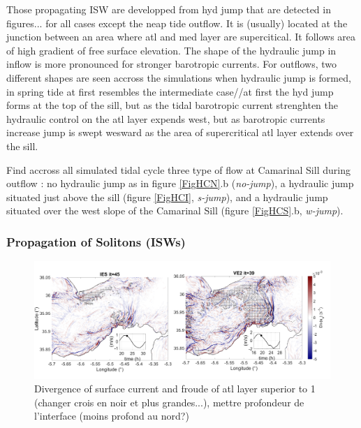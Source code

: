 Those propagating ISW are developped from hyd jump that are detected in figures... for all cases except the neap tide outflow. It is (usually) located at the junction between an area where atl and med layer are supercitical. It follows area of high gradient of free surface elevation. The shape of the hydraulic jump in inflow is more pronounced for stronger barotropic currents. For outflows, two different shapes are seen accross the simulations when hydraulic jump is formed, in spring tide at first resembles the intermediate case//at first the hyd jump forms at the top of the sill, but as the tidal barotropic current strenghten the hydraulic control on the atl layer expends west, but as barotropic currents increase jump is swept wesward as the area of supercritical atl layer extends over the sill.

Find accross all simulated tidal cycle three type of flow at Camarinal Sill during outflow : no hydraulic jump as in figure \ref{FigHCN}.b (\textit{no-jump}), a hydraulic jump situated just above the sill (figure \ref{FigHCI}, \textit{s-jump}), and a hydraulic jump situated over the west slope of the Camarinal Sill (figure \ref{FigHCS}.b, \textit{w-jump}).




\subsubsection{Propagation of Solitons (ISWs)}

\begin{figure}[!h]
 \centering
\includegraphics[width=\linewidth]{./GBR3D/FigWaveCont.png}
 \caption {Divergence of surface current and froude of atl layer superior to 1 (changer crois en noir et plus grandes...), mettre profondeur de l'interface (moins profond au nord?)}
 \label{FigISWGBR3D}
\end{figure}




